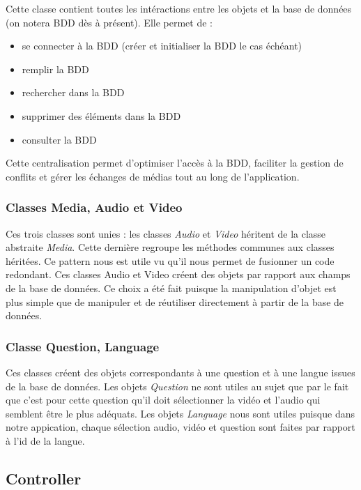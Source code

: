 Cette classe contient toutes les intéractions entre les objets et la base de données (on notera BDD dès à présent). Elle permet de :

\begin{itemize}
 \item se connecter à la BDD (créer et initialiser la BDD le cas échéant)
 \item remplir la BDD
 \item rechercher dans la BDD
 \item supprimer des éléments dans la BDD
 \item consulter la BDD
\end{itemize}

Cette centralisation permet d'optimiser l'accès à la BDD, faciliter la gestion de conflits et gérer les échanges de médias tout au long de l'application.

\subsubsection{Classes Media, Audio et Video}

Ces trois classes sont unies : les classes \textit{Audio} et \textit{Video} héritent de la classe abstraite \textit{Media}. Cette dernière regroupe les méthodes communes aux classes héritées. Ce pattern nous est utile vu qu'il nous permet de fusionner un code redondant. Ces classes Audio et Video créent des objets par rapport aux champs de la base de données. Ce choix a été fait puisque la manipulation d'objet est plus simple que de manipuler et de réutiliser directement à partir de la base de données.

\subsubsection{Classe Question, Language}

Ces classes créent des objets correspondants à une question et à une langue issues de la base de données.
Les objets \textit{Question} ne sont utiles au sujet que par le fait que c'est pour cette question qu'il doit sélectionner la vidéo et l'audio qui semblent être le plus adéquats.
Les objets \textit{Language} nous sont utiles puisque dans notre appication, chaque sélection audio, vidéo et question sont faites par rapport à l'id de la langue.

\subsection{Controller}

